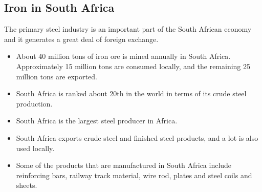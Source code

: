 \subsection{Iron in South Africa}

The primary steel industry is an important part of the South African economy and it generates a great deal of foreign exchange. 

\begin{itemize}
\item{About 40 million tons of iron ore is mined annually in South Africa. Approximately 15 million tons are consumed locally, and the remaining 25 million tons are exported.}
\item{South Africa is ranked about 20th in the world in terms of its crude steel production.}
\item{South Africa is the largest steel producer in Africa.}
\item{South Africa exports crude steel and finished steel products, and a lot is also used locally.}
\item{Some of the products that are manufactured in South Africa include reinforcing bars, railway track material, wire rod, plates and steel coils and sheets.}
\end{itemize}




